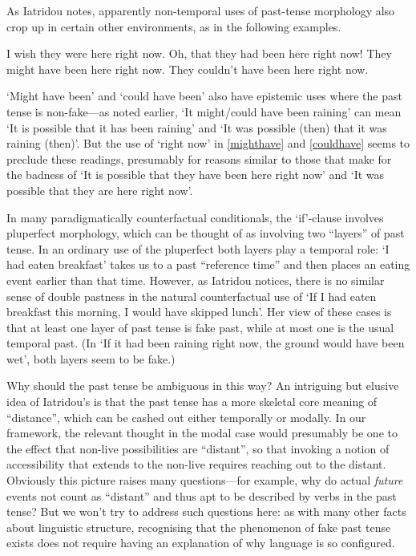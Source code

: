 \documentclass[If.tex]{subfiles}
\begin{document}
As Iatridou notes, apparently non-temporal uses of past-tense morphology also crop up in certain other environments, as in the following examples.
\begin{prop}
	\nitem 
	\begin{prop}
		\aitem
		I wish they were here right now.
		\aitem 
		Oh, that they had been here right now!
		\aitem \label{mighthave}
		They might have been here right now.
		\aitem \label{couldhave}
		They couldn't have been here right now.
	\end{prop}
\end{prop}
‘Might have been’ and ‘could have been’ also have epistemic uses where the past tense is non-fake---as noted earlier, ‘It might/could have been raining’ can mean ‘It is possible that it has been raining’ and ‘It was possible (then) that it was raining (then)’. But the use of ‘right now’ in \ref{mighthave} and \ref{couldhave} seems to preclude these readings, presumably for reasons similar to those that make for the badness of ‘It is possible that they have been here right now’ and ‘It was possible that they are here right now’.


In many paradigmatically counterfactual conditionals, the ‘if’-clause involves pluperfect morphology, which can be thought of as involving two “layers” of past tense. In an ordinary use of the pluperfect both layers play a temporal role: ‘I had eaten breakfast’ takes us to a past “reference time” and then places an eating event earlier than that time. However, as Iatridou notices, there is no similar sense of double pastness in the natural counterfactual use of ‘If I had eaten breakfast this morning, I would have skipped lunch’. Her view of these cases is that at least one layer of past tense is fake past, while at most one is the usual temporal past. (In ‘If it had been raining right now, the ground would have been wet’, both layers seem to be fake.)

Why should the past tense be ambiguous in this way? An intriguing but elusive idea of Iatridou's is that the past tense has a more skeletal core meaning of “distance”, which can be cashed out either temporally or modally.  In our framework, the relevant thought in the modal case would presumably be one to the effect that non-live possibilities are “distant”, so that invoking a notion of accessibility that extends to the non-live requires reaching out to the distant. Obviously this picture raises many questions---for example, why do actual \emph{future} events not count as “distant” and thus apt to be described by verbs in the past tense? But we won't try to address such questions here: as with many other facts about linguistic structure, recognising that the phenomenon of fake past tense exists does not require having an explanation of why language is so configured.
\end{document}
